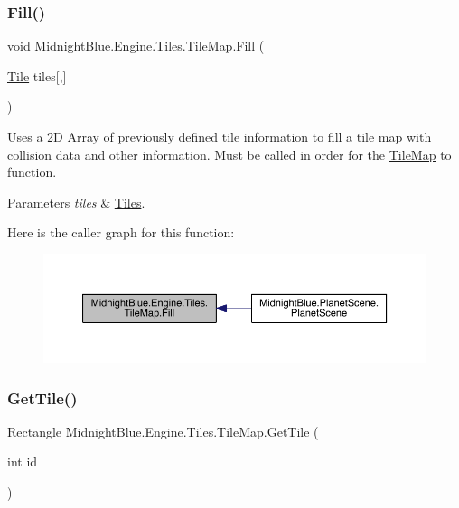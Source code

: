 \subsubsection{\texorpdfstring{Fill()}{Fill()}}
{\footnotesize\ttfamily void Midnight\+Blue.\+Engine.\+Tiles.\+Tile\+Map.\+Fill (\begin{DoxyParamCaption}\item[{\hyperlink{class_midnight_blue_1_1_tile}{Tile}}]{tiles\mbox{[},\mbox{]} }\end{DoxyParamCaption})\hspace{0.3cm}{\ttfamily [inline]}}



Uses a 2D Array of previously defined tile information to fill a tile map with collision data and other information. Must be called in order for the \hyperlink{class_midnight_blue_1_1_engine_1_1_tiles_1_1_tile_map}{Tile\+Map} to function. 


\begin{DoxyParams}{Parameters}
{\em tiles} & \hyperlink{namespace_midnight_blue_1_1_engine_1_1_tiles}{Tiles}.\\
\hline
\end{DoxyParams}
Here is the caller graph for this function\+:
\nopagebreak
\begin{figure}[H]
\begin{center}
\leavevmode
\includegraphics[width=350pt]{class_midnight_blue_1_1_engine_1_1_tiles_1_1_tile_map_ab2ae5b8ef2fb44d5267b8be7997ddb4c_icgraph}
\end{center}
\end{figure}
\hypertarget{class_midnight_blue_1_1_engine_1_1_tiles_1_1_tile_map_ae4d1521e4d80f255fb926141378966ca}{}\label{class_midnight_blue_1_1_engine_1_1_tiles_1_1_tile_map_ae4d1521e4d80f255fb926141378966ca} 
\subsubsection{\texorpdfstring{Get\+Tile()}{GetTile()}}
{\footnotesize\ttfamily Rectangle Midnight\+Blue.\+Engine.\+Tiles.\+Tile\+Map.\+Get\+Tile (\begin{DoxyParamCaption}\item[{int}]{id }\end{DoxyParamCaption})\hspace{0.3cm}{\ttfamily [inline]}}



